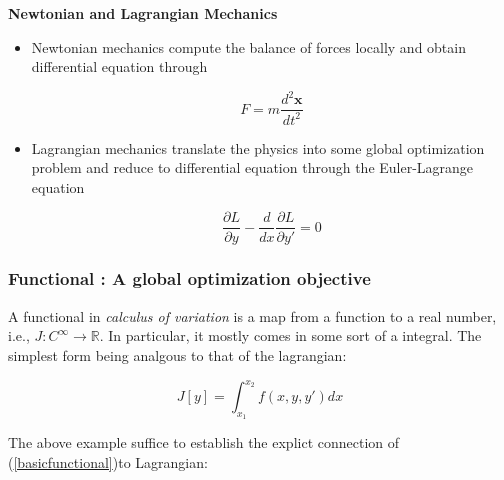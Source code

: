 \begin{framed}
\textbf{Newtonian and Lagrangian Mechanics}\\
\begin{itemize}
\item Newtonian mechanics compute the balance of forces locally and obtain differential equation through

\begin{equation}
F=m\frac{d^2\mathbf{x}}{dt^2}
\end{equation}


\item Lagrangian mechanics translate the physics into some global optimization problem  and reduce to differential equation through the Euler-Lagrange equation

\begin{equation}
\frac{\partial L}{\partial y}- \frac{d}{dx}\frac{\partial L}{\partial y'}=0
\end{equation}
\end{itemize}
\end{framed}

\subsubsection{Functional : A global optimization objective}

A functional in \textit{calculus of variation} is a map from a function to a real number, i.e., $J:C^{\infty} \to \mathbb{R}$. In particular, it mostly comes in some sort of a integral. The simplest form being analgous to that of the lagrangian:

\begin{equation}
\label{basicfunctional}
J[y] = \int_{x_1}^{x_2} f(x,y,y')dx
\end{equation}

The above example suffice to establish the explict connection of (\ref{basicfunctional})to Lagrangian:

